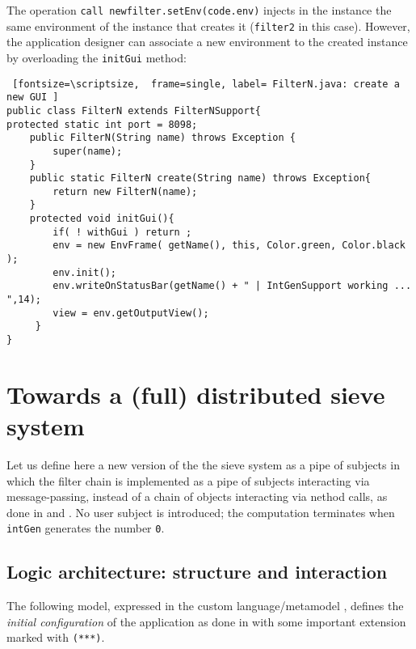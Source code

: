 \documentclass{../llncs}
\begin{document}
The operation  \texttt{call newfilter.setEnv(code.env)} injects in the instance the same environment of the instance that creates it (\texttt{filter2} in this case). However, the application designer can associate a new environment to the created instance by overloading the \texttt{initGui} method:

\begin{Verbatim} [fontsize=\scriptsize,  frame=single, label= FilterN.java: create a new GUI ]
public class FilterN extends FilterNSupport{
protected static int port = 8098;
	public FilterN(String name) throws Exception {
		super(name);
  	}	
	public static FilterN create(String name) throws Exception{
		return new FilterN(name);
 	}
	protected void initGui(){
		if( ! withGui ) return ;
	    env = new EnvFrame( getName(), this, Color.green, Color.black );
	    env.init();
	    env.writeOnStatusBar(getName() + " | IntGenSupport working ... ",14);
	    view = env.getOutputView();
 	 }
}
\end{Verbatim} 
 
\newpage
\section{Towards a (full) distributed sieve system}
Let us define here a new version of the the sieve system as a pipe of subjects in which the filter chain is implemented as a pipe of subjects interacting via message-passing, instead of a chain of objects interacting via nethod calls, as done in  and .
No user subject is introduced; the computation terminates when \texttt{intGen} generates the number \texttt{0}.

\subsection{Logic architecture: structure and interaction}
The following  model, expressed in the custom language/metamodel \contact{} \cite{Nat2013a}, defines the \textit{initial configuration} of the application as done in  with  some important extension marked with \texttt{(***)}.
\end{document}
